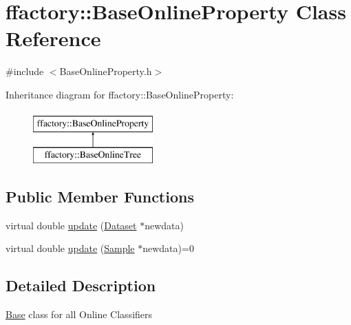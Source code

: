 \hypertarget{classffactory_1_1_base_online_property}{\section{ffactory\-:\-:Base\-Online\-Property Class Reference}
\label{classffactory_1_1_base_online_property}
}


{\ttfamily \#include $<$Base\-Online\-Property.\-h$>$}

Inheritance diagram for ffactory\-:\-:Base\-Online\-Property\-:\begin{figure}[H]
\begin{center}
\leavevmode
\includegraphics[height=2.000000cm]{classffactory_1_1_base_online_property}
\end{center}
\end{figure}
\subsection*{Public Member Functions}
\begin{DoxyCompactItemize}
\item 
virtual double \hyperlink{classffactory_1_1_base_online_property_a9cfb11c90f0c4e0a21a6c2d2b871d2fa}{update} (\hyperlink{classffactory_1_1_dataset}{Dataset} $\ast$newdata)
\item 
virtual double \hyperlink{classffactory_1_1_base_online_property_a770c65109a57a4cca772cb3ec143fe68}{update} (\hyperlink{classffactory_1_1_sample}{Sample} $\ast$newdata)=0
\end{DoxyCompactItemize}


\subsection{Detailed Description}
\hyperlink{classffactory_1_1_base}{Base} class for all Online Classifiers 

